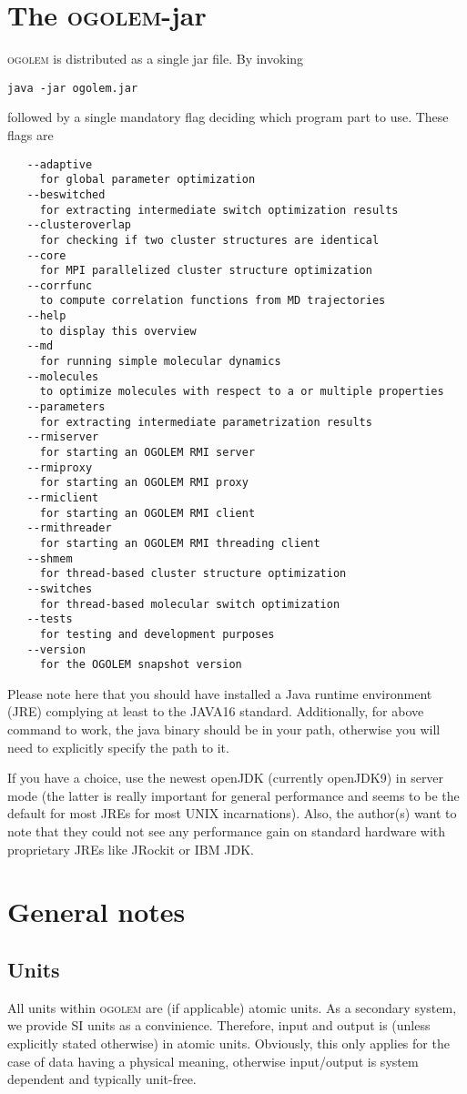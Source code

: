 \documentclass[a4paper,10pt]{scrbook}
\newcommand{\ogo}{\textsc{ogolem}}
\begin{document}
\section{The \ogo{}-jar}
\ogo{} is distributed as a single jar file. By invoking
\begin{verbatim}
java -jar ogolem.jar
\end{verbatim}
followed by a single mandatory flag deciding which program part to use. These
flags are
\begin{verbatim}
   --adaptive
     for global parameter optimization
   --beswitched
     for extracting intermediate switch optimization results
   --clusteroverlap
     for checking if two cluster structures are identical
   --core
     for MPI parallelized cluster structure optimization
   --corrfunc
     to compute correlation functions from MD trajectories
   --help
     to display this overview
   --md
     for running simple molecular dynamics
   --molecules
     to optimize molecules with respect to a or multiple properties
   --parameters
     for extracting intermediate parametrization results
   --rmiserver
     for starting an OGOLEM RMI server
   --rmiproxy
     for starting an OGOLEM RMI proxy
   --rmiclient
     for starting an OGOLEM RMI client
   --rmithreader
     for starting an OGOLEM RMI threading client
   --shmem
     for thread-based cluster structure optimization
   --switches
     for thread-based molecular switch optimization
   --tests
     for testing and development purposes
   --version
     for the OGOLEM snapshot version
\end{verbatim}
Please note here that you should have installed a Java runtime environment (JRE)
complying at least to the JAVA16 standard. Additionally, for above command to
work, the java binary should be in your path, otherwise you will need to
explicitly specify the path to it.

If you have a choice, use the newest openJDK (currently openJDK9) in server mode
(the latter is really important for general performance and seems to be the
default for most JREs for most UNIX incarnations). Also, the author(s) want to
note that they could not see any performance gain on standard hardware
with proprietary JREs like JRockit or IBM JDK.

\section{General notes}
\subsection{Units}
All units within \ogo{} are (if applicable) atomic units. As a secondary system,
we provide SI units as a convinience. Therefore, input and output is (unless 
explicitly
stated otherwise) in atomic units. Obviously, this only applies for the case of 
data
having a physical meaning, otherwise input/output is system dependent and 
typically
unit-free.
\end{document}

